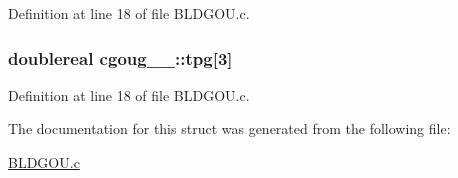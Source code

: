 Definition at line 18 of file B\+L\+D\+G\+O\+U.\+c.

\subsubsection[{\texorpdfstring{tpg}{tpg}}]{\setlength{\rightskip}{0pt plus 5cm}doublereal cgoug\+\_\+\_\+\+::tpg\mbox{[}3\mbox{]}}\hypertarget{structcgoug__1___a44680fe66ef7c1d7f4a7d210a24333e4}{}\label{structcgoug__1___a44680fe66ef7c1d7f4a7d210a24333e4}


Definition at line 18 of file B\+L\+D\+G\+O\+U.\+c.



The documentation for this struct was generated from the following file\+:\begin{DoxyCompactItemize}
\item 
\hyperlink{BLDGOU_8c}{B\+L\+D\+G\+O\+U.\+c}\end{DoxyCompactItemize}

